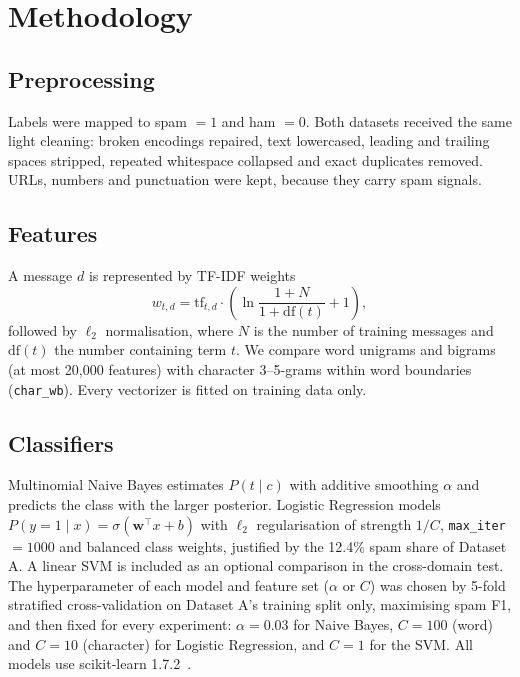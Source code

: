 \documentclass[conference]{IEEEtran}
\begin{document}
\section{Methodology}
\subsection{Preprocessing}
Labels were mapped to spam $=1$ and ham $=0$. Both datasets received the same light cleaning: broken encodings repaired, text lowercased, leading and trailing spaces stripped, repeated whitespace collapsed and exact duplicates removed. URLs, numbers and punctuation were kept, because they carry spam signals.

\subsection{Features}
A message $d$ is represented by TF-IDF weights~\cite{salton1988}
\begin{equation}
w_{t,d} = \mathrm{tf}_{t,d}\cdot\left(\ln\frac{1+N}{1+\mathrm{df}(t)}+1\right),
\end{equation}
followed by $\ell_2$ normalisation, where $N$ is the number of training messages and $\mathrm{df}(t)$ the number containing term $t$. We compare word unigrams and bigrams (at most 20,000 features) with character 3--5-grams within word boundaries (\texttt{char\_wb}). Every vectorizer is fitted on training data only.

\subsection{Classifiers}
Multinomial Naive Bayes estimates $P(t\mid c)$ with additive smoothing $\alpha$ and predicts the class with the larger posterior. Logistic Regression models $P(y=1\mid x)=\sigma(\mathbf{w}^\top x+b)$ with $\ell_2$ regularisation of strength $1/C$, \texttt{max\_iter} $=1000$ and balanced class weights, justified by the 12.4\% spam share of Dataset A. A linear SVM is included as an optional comparison in the cross-domain test. The hyperparameter of each model and feature set ($\alpha$ or $C$) was chosen by 5-fold stratified cross-validation on Dataset A's training split only, maximising spam F1, and then fixed for every experiment: $\alpha=0.03$ for Naive Bayes, $C=100$ (word) and $C=10$ (character) for Logistic Regression, and $C=1$ for the SVM. All models use scikit-learn 1.7.2~\cite{pedregosa2011}.
\end{document}
